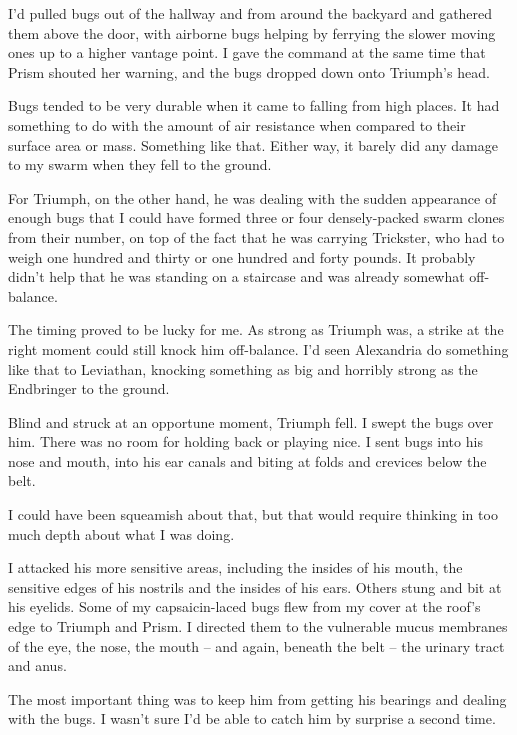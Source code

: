 I'd pulled bugs out of the hallway and from around the backyard and gathered them above the door, with airborne bugs helping by ferrying the slower moving ones up to a higher vantage point.  I gave the command at the same time that Prism shouted her warning, and the bugs dropped down onto Triumph's head.



Bugs tended to be very durable when it came to falling from high places.  It had something to do with the amount of air resistance when compared to their surface area or mass.  Something like that.  Either way, it barely did any damage to my swarm when they fell to the ground.



For Triumph, on the other hand, he was dealing with the sudden appearance of enough bugs that I could have formed three or four densely-packed swarm clones from their number, on top of the fact that he was carrying Trickster, who had to weigh one hundred and thirty or one hundred and forty pounds.  It probably didn't help that he was standing on a staircase and was already somewhat off-balance.



The timing proved to be lucky for me.  As strong as Triumph was, a strike at the right moment could still knock him off-balance.  I'd seen Alexandria do something like that to Leviathan, knocking something as big and horribly strong as the Endbringer to the ground.



Blind and struck at an opportune moment, Triumph fell.  I swept the bugs over him.  There was no room for holding back or playing nice.  I sent bugs into his nose and mouth, into his ear canals and biting at folds and crevices below the belt.



I could have been squeamish about that, but that would require thinking in too much depth about what I was doing.



I attacked his more sensitive areas, including the insides of his mouth, the sensitive edges of his nostrils and the insides of his ears.  Others stung and bit at his eyelids.  Some of my capsaicin-laced bugs flew from my cover at the roof's edge to Triumph and Prism.  I directed them to the vulnerable mucus membranes of the eye, the nose, the mouth – and again, beneath the belt – the urinary tract and anus.



The most important thing was to keep him from getting his bearings and dealing with the bugs.  I wasn't sure I'd be able to catch him by surprise a second time.



